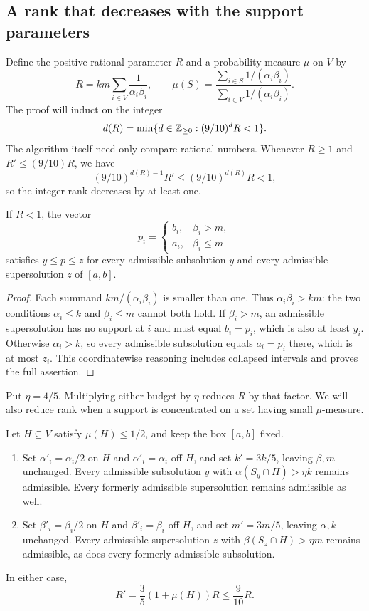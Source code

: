 \subsection{A rank that decreases with the support parameters}

Define the positive rational parameter $R$ and a probability measure
$\mu$ on $V$ by
\begin{equation}\label{eq:rank-parameter}
 R=km\sum_{i\in V}\frac1{\alpha_i\beta_i},\qquad
 \mu(S)=
 \frac{\displaystyle\sum_{i\in S}1/(\alpha_i\beta_i)}
      {\displaystyle\sum_{i\in V}1/(\alpha_i\beta_i)}.
\end{equation}
The proof will induct on the integer
\[
 d(R)=\min\{d\in\mathbb Z_{\ge0}:(9/10)^dR<1\}.
\]
The algorithm itself need only compare rational numbers. Whenever
$R\ge1$ and $R'\le(9/10)R$, we have
\[
 (9/10)^{d(R)-1}R'\le(9/10)^{d(R)}R<1,
\]
so the integer rank decreases by at least one.

\begin{lemma}\label{lem:small-rank}
If $R<1$, the vector
\[
 p_i=\begin{cases}b_i,&\beta_i>m,\\a_i,&\beta_i\le m\end{cases}
\]
satisfies $y\le p\le z$ for every admissible subsolution $y$ and every
admissible supersolution $z$ of $[a,b]$.
\end{lemma}

\begin{proof}
Each summand $km/(\alpha_i\beta_i)$ is smaller than one. Thus
$\alpha_i\beta_i>km$: the two conditions $\alpha_i\le k$ and
$\beta_i\le m$ cannot both hold. If $\beta_i>m$, an admissible
supersolution has no support at $i$ and must equal $b_i=p_i$, which is
also at least $y_i$. Otherwise $\alpha_i>k$, so every admissible
subsolution equals $a_i=p_i$ there, which is at most $z_i$.
This coordinatewise reasoning includes collapsed intervals and proves
the full assertion.
\end{proof}

Put $\eta=4/5$. Multiplying either budget by $\eta$ reduces $R$ by
that factor. We will also reduce rank when a support is concentrated on
a set having small $\mu$-measure.

\begin{lemma}[Reweighting]\label{lem:reweighting}
Let $H\subseteq V$ satisfy $\mu(H)\le1/2$, and keep the box $[a,b]$
fixed.
\begin{enumerate}[label=\textup{(\roman*)}]
\item Set $\alpha'_i=\alpha_i/2$ on $H$ and $\alpha'_i=\alpha_i$ off
$H$, and set $k'=3k/5$, leaving $\beta,m$ unchanged. Every admissible
subsolution $y$ with $\alpha(S_y\cap H)>\eta k$ remains admissible.
Every formerly admissible supersolution remains admissible as well.
\item Set $\beta'_i=\beta_i/2$ on $H$ and $\beta'_i=\beta_i$ off $H$,
and set $m'=3m/5$, leaving $\alpha,k$ unchanged. Every admissible
supersolution $z$ with $\beta(S_z\cap H)>\eta m$ remains admissible,
as does every formerly admissible subsolution.
\end{enumerate}
In either case,
\[
 R'=\frac35(1+\mu(H))R\le\frac9{10}R.
\]
\end{lemma}

